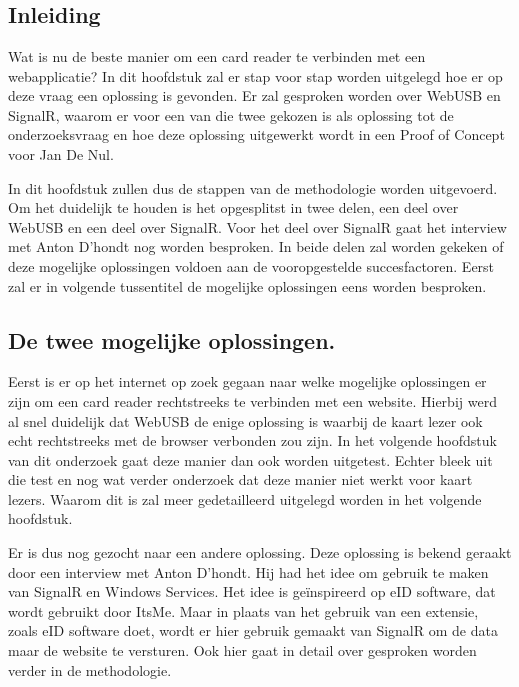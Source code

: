 \graphicspath{{graphics/}}
\chapter{}%
\label{ch:Onderzoek en Proof of Concept}
\section{Inleiding}
Wat is nu de beste manier om een card reader te verbinden met een webapplicatie? In dit hoofdstuk zal er stap voor stap worden uitgelegd hoe er op deze vraag een oplossing is gevonden. Er zal gesproken worden over WebUSB en SignalR, waarom er voor een van die twee gekozen is als oplossing tot de onderzoeksvraag en hoe deze oplossing uitgewerkt wordt in een Proof of Concept voor Jan De Nul.

In dit hoofdstuk zullen dus de stappen van de methodologie worden uitgevoerd. Om het duidelijk te houden is het opgesplitst in twee delen, een deel over WebUSB en een deel over SignalR. Voor het deel over SignalR gaat het interview met Anton D'hondt nog worden besproken. In beide delen zal worden gekeken of deze mogelijke oplossingen voldoen aan de vooropgestelde succesfactoren. 
Eerst zal er in volgende tussentitel de mogelijke oplossingen eens worden besproken.


\section{De twee mogelijke oplossingen. }
Eerst is er op het internet op zoek gegaan naar welke mogelijke oplossingen er zijn om een card reader rechtstreeks te verbinden met een website. Hierbij werd al snel duidelijk dat WebUSB de enige oplossing is waarbij de kaart lezer ook echt rechtstreeks met de browser verbonden zou zijn. In het volgende hoofdstuk van dit onderzoek gaat deze manier dan ook worden uitgetest. Echter bleek uit die test en nog wat verder onderzoek dat deze manier niet werkt voor kaart lezers. Waarom dit is zal meer gedetailleerd uitgelegd worden in het volgende hoofdstuk. 

Er is dus nog gezocht naar een andere oplossing. Deze oplossing is bekend geraakt door een interview met Anton D’hondt. Hij had het idee om gebruik te maken van SignalR en Windows Services. Het idee is geïnspireerd op eID software, dat wordt gebruikt door ItsMe. Maar in plaats van het gebruik van een extensie, zoals eID software doet, wordt er hier gebruik gemaakt van SignalR om de data maar de website te versturen. Ook hier gaat in detail over gesproken worden verder in de methodologie. 



